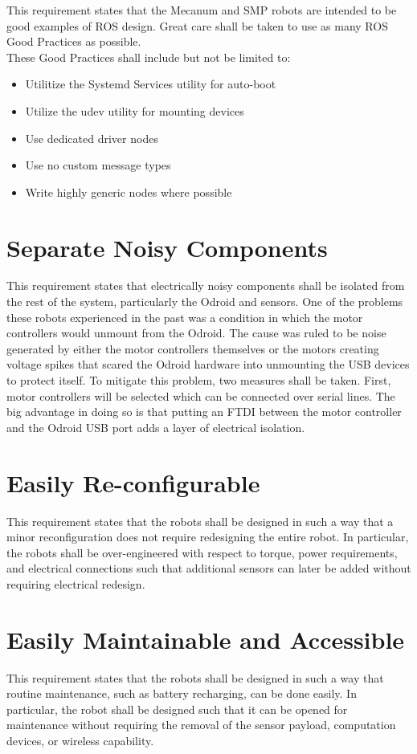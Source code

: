 This requirement states that the Mecanum and SMP robots are intended to be good examples of ROS design. Great care shall be taken to use as many ROS Good Practices as possible.\\

These Good Practices shall include but not be limited to:

\begin{itemize}
	\item{Utilitize the Systemd Services utility for auto-boot}
	\item{Utilize the udev utility for mounting devices}
	\item{Use dedicated driver nodes}
	\item{Use no custom message types}
	\item{Write highly generic nodes where possible}
\end{itemize}

\section{Separate Noisy Components}

This requirement states that electrically noisy components shall be isolated from the rest of the system, particularly the Odroid and sensors. One of the problems these robots experienced in the past was a condition in which the motor controllers would unmount from the Odroid. The cause was ruled to be noise generated by either the motor controllers themselves or the motors creating voltage spikes that scared the Odroid hardware into unmounting the USB devices to protect itself. To mitigate this problem, two measures shall be taken. First, motor controllers will be selected which can be connected over serial lines. The big advantage in doing so is that putting an FTDI between the motor controller and the Odroid USB port adds a layer of electrical isolation.

\section{Easily Re-configurable}

This requirement states that the robots shall be designed in such a way that a minor reconfiguration does not require redesigning the entire robot. In particular, the robots shall be over-engineered with respect to torque, power requirements, and electrical connections such that additional sensors can later be added without requiring electrical redesign.

\section{Easily Maintainable and Accessible}

This requirement states that the robots shall be designed in such a way that routine maintenance, such as battery recharging, can be done easily. In particular, the robot shall be designed such that it can be opened for maintenance without requiring the removal of the sensor payload, computation devices, or wireless capability.